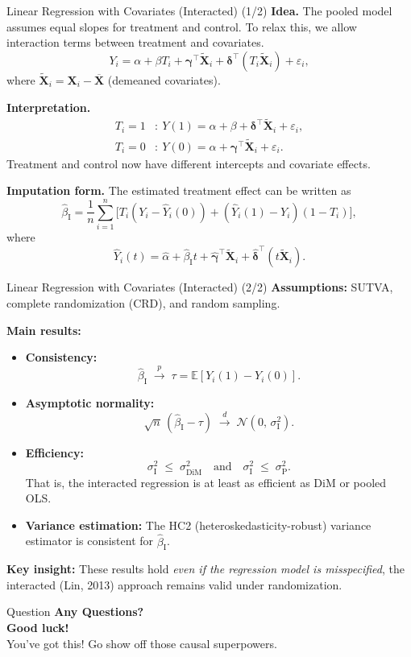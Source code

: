 \documentclass[10pt, handout]{beamer}
\theoremstyle{plain}
\newcommand{\bX}{\bm{X}}
\newcommand{\E}{\mathbb{E}}
\begin{document}
\begin{frame}{Linear Regression with Covariates (Interacted) (1/2)}
\small
\textbf{Idea.} The pooled model assumes equal slopes for treatment and control.
To relax this, we allow interaction terms between treatment and covariates.
\pause
\[
Y_i = \alpha + \beta T_i + \bm{\gamma}^\top \tilde{\bX}_i + \bm{\delta}^\top (T_i \tilde{\bX}_i) + \varepsilon_i,
\]
where \(\tilde{\bX}_i = \bX_i - \overline{\bX}\) (demeaned covariates).
\pause

\textbf{Interpretation.}
\begin{align*}
T_i = 1 &:~ Y(1) = \alpha + \beta + \bm{\delta}^\top \tilde{\bX}_i + \varepsilon_i, \\[3pt]
T_i = 0 &:~ Y(0) = \alpha + \bm{\gamma}^\top \tilde{\bX}_i + \varepsilon_i.
\end{align*}
\pause
Treatment and control now have different intercepts and covariate effects.

\pause
\textbf{Imputation form.}
The estimated treatment effect can be written as
\[
\hat{\beta}_{\text{I}}
= \frac{1}{n}\sum_{i=1}^n
\big[T_i(Y_i - \widehat{Y}_i(0)) + (\widehat{Y}_i(1) - Y_i)(1-T_i)\big],
\]
where
\[
\widehat{Y}_i(t)
= \hat\alpha + \hat\beta_{\text{I}}t + \hat{\bm{\gamma}}^\top \tilde{\bX}_i + \hat{\bm{\delta}}^\top (t\tilde{\bX}_i).
\]
\end{frame}

\begin{frame}{Linear Regression with Covariates (Interacted) (2/2)}
\small
\textbf{Assumptions:} SUTVA, complete randomization (CRD), and random sampling.
\pause
\vspace{0.8em}

\textbf{Main results:}
\begin{itemize}
  \item \textbf{Consistency:} 
  \[
  \hat\beta_{\text{I}} \;\xrightarrow{p}\; \tau = \E[Y_i(1) - Y_i(0)].
  \]
  \pause
  \item \textbf{Asymptotic normality:}
  \[
  \sqrt{n}\,(\hat\beta_{\text{I}} - \tau)
  \;\xrightarrow{d}\;
  \mathcal{N}\!\left(0,\,\sigma_{\text{I}}^2\right).
  \]
  \pause
  \item \textbf{Efficiency:}
  \[
  \sigma_{\text{I}}^2 \;\le\; \sigma_{\text{DiM}}^2
  \quad\text{and}\quad
  \sigma_{\text{I}}^2 \;\le\; \sigma_{\text{P}}^2.
  \]
  That is, the interacted regression is at least as efficient as DiM or pooled OLS.
  \pause
  \item \textbf{Variance estimation:}  
  The HC2 (heteroskedasticity-robust) variance estimator is consistent for \(\hat\beta_{\text{I}}\).
\end{itemize}
\pause
\bigskip
\textbf{Key insight:} These results hold \emph{even if the regression model is misspecified}, the interacted (Lin, 2013) approach remains valid under randomization.
\end{frame}


\begin{frame}{Question}
 \centering
  {\Large \textbf{Any Questions?}}\\[1em]
  {\Large \textbf{Good luck!}}\\[1em]
  {\Large You’ve got this! Go show off those causal superpowers.}
\end{frame}
\end{document}
